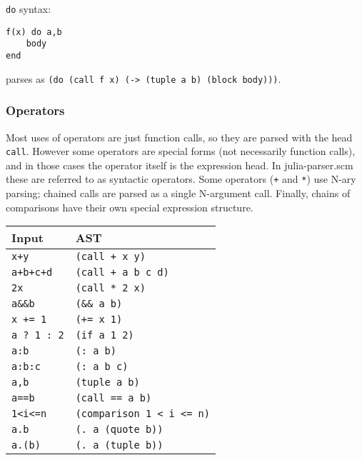 \texttt{do} syntax:




\begin{verbatim}
f(x) do a,b
    body
end
\end{verbatim}



parses as \texttt{(do (call f x) (-> (tuple a b) (block body)))}.



\hypertarget{16991843071018324380}{}


\subsubsection{Operators}



Most uses of operators are just function calls, so they are parsed with the head \texttt{call}. However some operators are special forms (not necessarily function calls), and in those cases the operator itself is the expression head. In julia-parser.scm these are referred to as {\textquotedbl}syntactic operators{\textquotedbl}. Some operators (\texttt{+} and \texttt{*}) use N-ary parsing; chained calls are parsed as a single N-argument call. Finally, chains of comparisons have their own special expression structure.




\begin{table}[h]

\begin{tabulary}{\linewidth}{|L|L|}
\hline
Input & AST \\
\hline
\texttt{x+y} & \texttt{(call + x y)} \\
\hline
\texttt{a+b+c+d} & \texttt{(call + a b c d)} \\
\hline
\texttt{2x} & \texttt{(call * 2 x)} \\
\hline
\texttt{a\&\&b} & \texttt{(\&\& a b)} \\
\hline
\texttt{x += 1} & \texttt{(+= x 1)} \\
\hline
\texttt{a ? 1 : 2} & \texttt{(if a 1 2)} \\
\hline
\texttt{a:b} & \texttt{(: a b)} \\
\hline
\texttt{a:b:c} & \texttt{(: a b c)} \\
\hline
\texttt{a,b} & \texttt{(tuple a b)} \\
\hline
\texttt{a==b} & \texttt{(call == a b)} \\
\hline
\texttt{1<i<=n} & \texttt{(comparison 1 < i <= n)} \\
\hline
\texttt{a.b} & \texttt{(. a (quote b))} \\
\hline
\texttt{a.(b)} & \texttt{(. a (tuple b))} \\
\hline
\end{tabulary}

\end{table}



